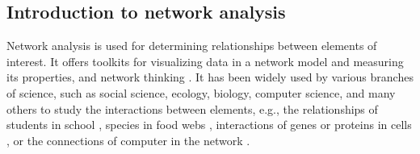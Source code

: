 \documentclass[12pt, oneside]{report}
\begin{document}
\subsection*{Introduction to network analysis}
Network analysis is used for determining relationships between elements of interest. It offers toolkits for visualizing data in a network model and measuring its properties, and network thinking \citep{PROULX:2005hx}. It has been widely used by various branches of science, such as social science, ecology, biology, computer science, and many others to study the interactions between elements, e.g., the relationships of students in school \citep{moody2001race}, species in food webs \citep{krause2003compartments}, interactions of genes or proteins in cells \citep{guimera2005functional}, or the connections of computer in the network \citep{pastor2001epidemic, newman2006modularity}.
\end{document}
